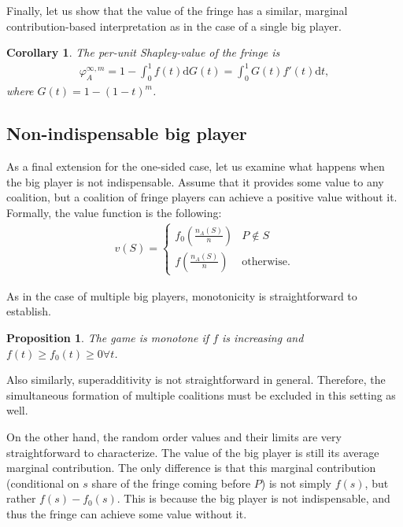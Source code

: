 \documentclass[a4paper]{article}
\newtheorem{proposition}{Proposition}
\newtheorem{corollary}{Corollary}
\newcommand{\dt}{\mathrm{d}t}
\newcommand{\dG}{\mathrm{d}G}
\begin{document}
Finally, let us show that the value of the fringe has a similar, marginal contribution-based interpretation as in the case of a single big player.

\begin{corollary}
    \label{cor:multiple_platforms}
    The per-unit Shapley-value of the fringe is
    \begin{align*}
        \varphi_A^{\infty, m} = 1 - \int_0^1 f(t) \dG(t) = \int_0^1 G(t) f'(t) \dt ,
    \end{align*}
    where $G(t) = 1 - (1-t)^m$.
\end{corollary}


\subsection{Non-indispensable big player}

As a final extension for the one-sided case, let us examine what happens when the big player is not indispensable.
Assume that it provides some value to any coalition, but a coalition of fringe players can achieve a positive value without it.
Formally, the value function is the following:
\begin{align*}
    v(S) = \begin{cases}
        f_0\left(\frac{n_A(S)}{n}\right) & P \notin S \\
        f\left(\frac{n_A(S)}{n}\right)   & \text{otherwise}.
    \end{cases}
\end{align*}

As in the case of multiple big players, monotonicity is straightforward to establish.
\begin{proposition}
    The game is monotone if $f$ is increasing and $f(t) \geq f_0(t) \geq 0 \forall t$.
\end{proposition}
Also similarly, superadditivity is not straightforward in general.
Therefore, the simultaneous formation of multiple coalitions must be excluded in this setting as well.

On the other hand, the random order values and their limits are very straightforward to characterize.
The value of the big player is still its average marginal contribution.
The only difference is that this marginal contribution (conditional on $s$ share of the fringe coming before $P$) is not simply $f(s)$, but rather $f(s) - f_0(s)$.
This is because the big player is not indispensable, and thus the fringe can achieve some value without it.
\end{document}
